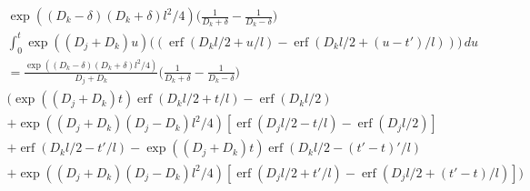 \documentclass[a4paper]{article}
\newcommand{\erf}{\operatorname{erf}}
\begin{document}
\begin{multline}
  \exp((D_k-\delta)(D_k+\delta)l^2/4)
  \bigg(\frac{1}{D_k+\delta} - \frac{1}{D_k - \delta}\bigg) \\
  \int_0^t \exp((D_j + D_k) u)
  \bigg(
  (\erf(D_k l/2 + u/l) - \erf(D_k l/2  + (u - t')/l) )
  \bigg) \,du \\
  =
  \frac{\exp((D_k-\delta)(D_k+\delta)l^2/4)}{D_j + D_k}
  \bigg(\frac{1}{D_k+\delta} - \frac{1}{D_k - \delta}\bigg) \\
  \bigg(
  \exp((D_j + D_k) t) \erf(D_k l/2 + t/l) - \erf(D_k l / 2) \\
  + \exp((D_j + D_k)(D_j - D_k)l^2/4)[\erf(D_j l/2 - t/l) -
  \erf(D_j l/2)] \\
  + \erf(D_k l / 2 - t'/l) - 
  \exp((D_j + D_k) t) \erf(D_k l / 2 - (t'-t)'/l) \\
  + \exp((D_j + D_k)(D_j - D_k)l^2/4)[\erf(D_j l/2 + t'/l) -
  \erf(D_j l/2 + (t'-t)/l)]
  \bigg)
\end{multline}
\end{document}
